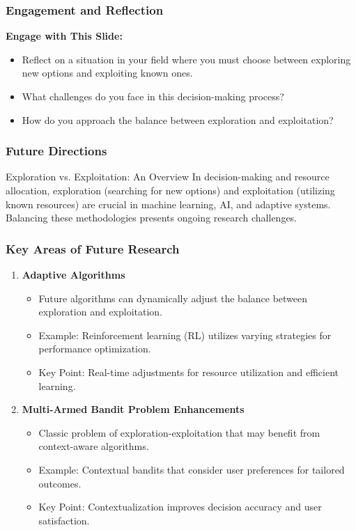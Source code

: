 \documentclass[aspectratio=169]{beamer}
\begin{document}
\begin{frame}[fragile]
    \frametitle{Engagement and Reflection}
    
    \textbf{Engage with This Slide:}
    \begin{itemize}
        \item Reflect on a situation in your field where you must choose between exploring new options and exploiting known ones.
        \item What challenges do you face in this decision-making process?
        \item How do you approach the balance between exploration and exploitation?
    \end{itemize}
\end{frame}

\begin{frame}[fragile]
    \frametitle{Future Directions}
    \begin{block}{Exploration vs. Exploitation: An Overview}
        In decision-making and resource allocation, exploration (searching for new options) and exploitation (utilizing known resources) are crucial in machine learning, AI, and adaptive systems. Balancing these methodologies presents ongoing research challenges.
    \end{block}
\end{frame}

\begin{frame}[fragile]
    \frametitle{Key Areas of Future Research}
    \begin{enumerate}
        \item \textbf{Adaptive Algorithms}
            \begin{itemize}
                \item Future algorithms can dynamically adjust the balance between exploration and exploitation.
                \item Example: Reinforcement learning (RL) utilizes varying strategies for performance optimization.
                \item Key Point: Real-time adjustments for resource utilization and efficient learning.
            \end{itemize}
        
        \item \textbf{Multi-Armed Bandit Problem Enhancements}
            \begin{itemize}
                \item Classic problem of exploration-exploitation that may benefit from context-aware algorithms.
                \item Example: Contextual bandits that consider user preferences for tailored outcomes.
                \item Key Point: Contextualization improves decision accuracy and user satisfaction.
            \end{itemize}
    \end{enumerate}
\end{frame}
\end{document}
